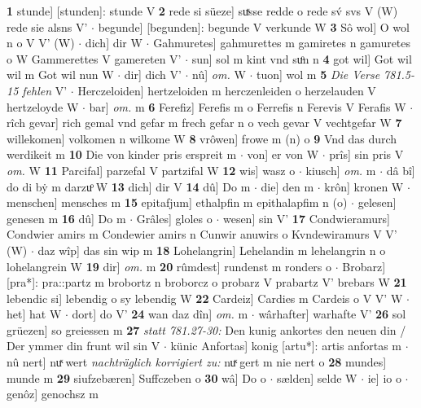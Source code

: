 \documentclass[8pt,a4paper,notitlepage]{article}
\begin{document}
\begin{table}[ht]
\begin{minipage}[t]{0.5\linewidth}
\textbf{1} stunde] [stunden]: stunde V \textbf{2} rede si süeze] suͯsse redde o rede sv́ svs V (W) rede sie alsns V'  $\cdot$ begunde] [begunden]: begunde V verkunde W \textbf{3} Sô wol] O wol n o V V' (W)  $\cdot$ dich] dir W  $\cdot$ Gahmuretes] gahmurettes m gamiretes n gamuretes o W Gammerettes V gamereten V'  $\cdot$ sun] sol m kint vnd suͦn n \textbf{4} got wil] Got wil wil m Got wil nun W  $\cdot$ dir] dich V'  $\cdot$ nû] \textit{om.} W  $\cdot$ tuon] wol m \textbf{5} \textit{Die Verse 781.5-15 fehlen} V'   $\cdot$ Herczeloiden] hertzeloiden m herczenleiden o herzelauden V hertzeloyde W  $\cdot$ bar] \textit{om.} m \textbf{6} Ferefiz] Ferefis m o Ferrefis n Ferevis V Ferafis W  $\cdot$ rîch gevar] rich gemal vnd gefar m frech gefar n o vech gevar V vechtgefar W \textbf{7} willekomen] volkomen n wilkome W \textbf{8} vrôwen] frowe m (n) o \textbf{9} Vnd das durch werdikeit m \textbf{10} Die von kinder pris erspreit m  $\cdot$ von] er von W  $\cdot$ prîs] sin pris V \textit{om.} W \textbf{11} Parcifal] parzefal V partzifal W \textbf{12} wis] wasz o  $\cdot$ kiusch] \textit{om.} m  $\cdot$ dâ bî] do di bẏ m darzuͦ W \textbf{13} dich] dir V \textbf{14} dû] Do m  $\cdot$ die] den m  $\cdot$ krôn] kronen W  $\cdot$ menschen] mensches m \textbf{15} epitafjum] ethalpfin m epithalapfim n (o)  $\cdot$ gelesen] genesen m \textbf{16} dû] Do m  $\cdot$ Grâles] gloles o  $\cdot$ wesen] sin V' \textbf{17} Condwieramurs] Condwier amirs m Condewier amirs n Cunwir anuwirs o Kvndewiramurs V V' (W)  $\cdot$ daz wîp] das sin wip m \textbf{18} Lohelangrin] Lehelandin m lehelangrin n o lohelangrein W \textbf{19} dir] \textit{om.} m \textbf{20} rûmdest] rundenst m ronders o  $\cdot$ Brobarz] [pra*]: pra::partz m brobortz n broborcz o probarz V prabartz V' brebars W \textbf{21} lebendic si] lebendig o sy lebendig W \textbf{22} Cardeiz] Cardies m Cardeis o V V' W  $\cdot$ het] hat W  $\cdot$ dort] do V' \textbf{24} wan daz dîn] \textit{om.} m  $\cdot$ wârhafter] warhafte V' \textbf{26} sol grüezen] so greiessen m \textbf{27} \textit{statt 781.27-30:} Den kunig ankortes den neuen din / Der ymmer din frunt wil sin V   $\cdot$ künic Anfortas] konig [artu*]: artis anfortas m  $\cdot$ nû nert] nuͯ wert \textit{nachträglich korrigiert zu:} nuͯ gert m nie nert o \textbf{28} mundes] munde m \textbf{29} siufzebæren] Suffczeben o \textbf{30} wâ] Do o  $\cdot$ sælden] selde W  $\cdot$ ie] io o  $\cdot$ genôz] genochsz m \newline
\end{minipage}
\end{table}
\newpage
\end{document}
